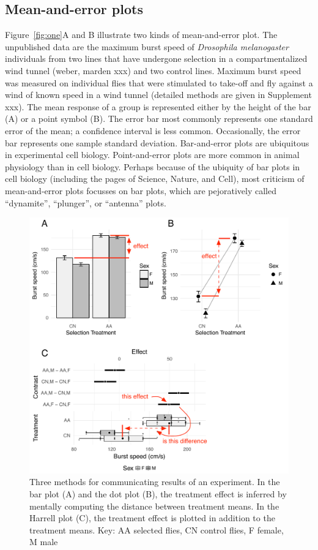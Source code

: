\documentclass[fleqn,10pt,lineno]{wlpeerj} %
\begin{document}
\subsection*{Mean-and-error plots}
Figure~\ref{fig:one}A and B illustrate two kinds of mean-and-error plot. The unpublished data are the maximum burst speed of \textit{Drosophila melanogaster} individuals from two lines that have undergone selection in a compartmentalized wind tunnel (weber, marden xxx) and two control lines. Maximum burst speed was measured on individual flies that were stimulated to take-off and fly against a wind of known speed in a wind tunnel (detailed methods are given in Supplement xxx). The mean response of a group is represented either by the height of the bar (A) or a point symbol (B). The error bar most commonly represents one standard error of the mean; a confidence interval is less common. Occasionally, the error bar represents one sample standard deviation. Bar-and-error plots are ubiquitous in experimental cell biology. Point-and-error plots are more common in animal physiology than in cell biology. Perhaps because of the ubiquity of bar plots in cell biology (including the pages of Science, Nature, and Cell), most criticism of mean-and-error plots focusses on bar plots, which are pejoratively called ``dynamite'', ``plunger'', or ``antenna'' plots.

\begin{figure}[]
\begin{center}
\includegraphics[width=4 in]{figs/fig1}
\caption{Three methods for communicating results of an experiment. In the bar plot (A) and the dot plot (B), the treatment effect is inferred by mentally computing the distance between treatment means. In the Harrell plot (C), the treatment effect is plotted in addition to the treatment means. Key: AA selected flies, CN control flies, F female, M male}
\label{fig:harrell}
\end{center}
\end{figure}
\end{document}
